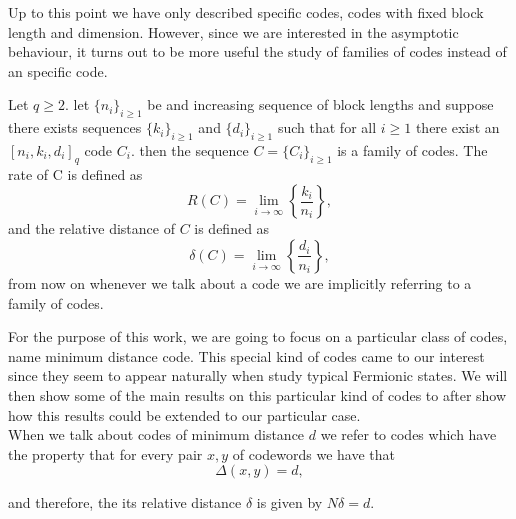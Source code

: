 \indent Up to this point we have only described specific codes, codes with fixed block length and dimension. However, since we are interested in the asymptotic behaviour, it turns out to be more useful the study of families of codes instead of an specific code.

\begin{definition}
 Let $q\geq 2$. let $\{n_i\}_{i\geq 1}$ be and increasing sequence of block lengths and suppose there exists sequences $\{k_i\}_{i\geq 1}$ and $\{d_i\}_{i\geq 1}$ such that for all $i\geq 1$ there exist an $[n_i,k_i,d_i]_q$ code $C_i$. then the sequence $C=\{C_i\}_{i\geq1}$ is a family of codes. The rate of C is defined as
\begin{equation}
R(C)=\lim _{i \rightarrow \infty}\left\{\frac{k_{i}}{n_{i}}\right\},
\label{CH2:Rate_of_family_code}
\end{equation}
and the relative distance of $C$ is defined as
\begin{equation}
\delta(C)=\lim _{i \rightarrow \infty}\left\{\frac{d_{i}}{n_{i}}\right\},
\label{CH2:Relative_distance_of_family_code}
\end{equation}
from now on whenever we talk about a code we are implicitly referring to a family of codes.
\end{definition}
\indent For the purpose of this work, we are going to focus on a particular class of codes, name minimum distance code. This special kind of codes came to our interest since they seem to appear naturally when study typical Fermionic states. We will then show some of the main results on this particular kind of codes to after show how this results could be extended to our particular case.\\

\indent When we talk about codes of minimum distance $d$ we refer to codes which have the property that for every pair $x,y$ of codewords we have that
\begin{equation}
\Delta(x,y) =d,
\end{equation}

and therefore, the its relative distance $\delta$ is given by $N\delta=d$.\\

